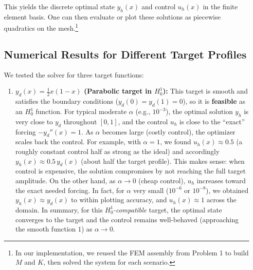 \documentclass[a4paper,10pt]{article}
\begin{document}
This yields the discrete optimal state \(y_h(x)\) and control \(u_h(x)\) in the finite element basis. One can then evaluate or plot these solutions as piecewise quadratics on the mesh.\footnote{In our implementation, we reused the FEM assembly from Problem 1 to build \(M\) and \(K\), then solved the system for each scenario.}

\subsection{Numerical Results for Different Target Profiles}
We tested the solver for three target functions:

\begin{enumerate}
	\item \textbf{\(y_d(x)=\frac{1}{2}x(1-x)\) (Parabolic target in \(H^1_0\)):} This target is smooth and satisfies the boundary conditions (\(y_d(0)=y_d(1)=0\)), so it is \textbf{feasible} as an \(H^1_0\) function. For typical moderate \(\alpha\) (e.g., \(10^{-3}\)), the optimal solution \(y_h\) is very close to \(y_d\) throughout \([0,1]\), and the control \(u_h\) is close to the “exact” forcing \(-y_d''(x)=1\). As \(\alpha\) becomes large (costly control), the optimizer scales back the control. For example, with \(\alpha=1\), we found \(u_h(x)\approx 0.5\) (a roughly constant control half as strong as the ideal) and accordingly \(y_h(x)\approx 0.5\,y_d(x)\) (about half the target profile). This makes sense: when control is expensive, the solution compromises by not reaching the full target amplitude. On the other hand, as \(\alpha\to 0\) (cheap control), \(u_h\) increases toward the exact needed forcing. In fact, for \(\alpha\) very small (\(10^{-6}\) or \(10^{-8}\)), we obtained \(y_h(x)\approx y_d(x)\) to within plotting accuracy, and \(u_h(x)\approx 1\) across the domain. In summary, for this \textit{\(H^1_0\)-compatible} target, the optimal state converges to the target and the control remains well-behaved (approaching the smooth function \(1\)) as \(\alpha\to 0\).


\end{enumerate}
\end{document}

